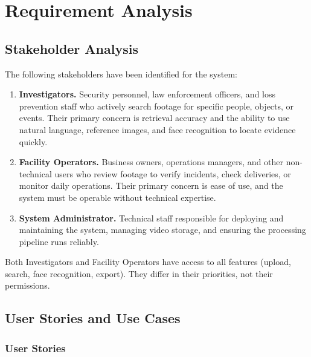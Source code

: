 \chapter{Requirement Analysis}
\label{chap:requirement-analysis}

\section{Stakeholder Analysis}
\label{section:stakeholder-analysis}

The following stakeholders have been identified for the system:

\begin{enumerate}
    \item \textbf{Investigators.} Security personnel, law enforcement officers, and loss prevention staff who actively search footage for specific people, objects, or events. Their primary concern is retrieval accuracy and the ability to use natural language, reference images, and face recognition to locate evidence quickly.

    \item \textbf{Facility Operators.} Business owners, operations managers, and other non-technical users who review footage to verify incidents, check deliveries, or monitor daily operations. Their primary concern is ease of use, and the system must be operable without technical expertise.

    \item \textbf{System Administrator.} Technical staff responsible for deploying and maintaining the system, managing video storage, and ensuring the processing pipeline runs reliably.
\end{enumerate}

Both Investigators and Facility Operators have access to all features (upload, search, face recognition, export). They differ in their priorities, not their permissions.

\section{User Stories and Use Cases}
\label{section:user-stories-use-cases}

\subsection{User Stories}

